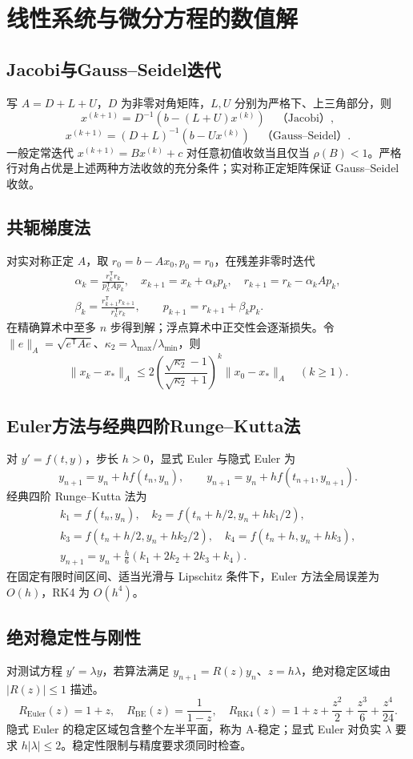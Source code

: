 \documentclass[../main.tex]{subfiles}
\begin{document}
\section{线性系统与微分方程的数值解}
\subsection{Jacobi与Gauss--Seidel迭代}
写 $A=D+L+U$，$D$ 为非零对角矩阵，$L,U$ 分别为严格下、上三角部分，则
\[
x^{(k+1)}=D^{-1}(b-(L+U)x^{(k)})\quad\text{（Jacobi）},
\]
\[
x^{(k+1)}=(D+L)^{-1}(b-Ux^{(k)})\quad\text{（Gauss--Seidel）}.
\]
一般定常迭代 $x^{(k+1)}=Bx^{(k)}+c$ 对任意初值收敛当且仅当 $\rho(B)<1$。严格行对角占优是上述两种方法收敛的充分条件；实对称正定矩阵保证 Gauss--Seidel 收敛。
\subsection{共轭梯度法}
对实对称正定 $A$，取 $r_0=b-Ax_0,p_0=r_0$，在残差非零时迭代
\begin{gather*}
\alpha_k=\frac{r_k^{\mathsf T}r_k}{p_k^{\mathsf T}Ap_k},\quad
x_{k+1}=x_k+\alpha_kp_k,\quad r_{k+1}=r_k-\alpha_kAp_k,\\
\beta_k=\frac{r_{k+1}^{\mathsf T}r_{k+1}}{r_k^{\mathsf T}r_k},\qquad
p_{k+1}=r_{k+1}+\beta_kp_k.
\end{gather*}
在精确算术中至多 $n$ 步得到解；浮点算术中正交性会逐渐损失。令 $\|e\|_A=\sqrt{e^{\mathsf T}Ae}$、$\kappa_2=\lambda_{\max}/\lambda_{\min}$，则
\[
\|x_k-x_*\|_A\le2\left(\frac{\sqrt{\kappa_2}-1}{\sqrt{\kappa_2}+1}\right)^k\|x_0-x_*\|_A\quad(k\ge1).
\]
\subsection{Euler方法与经典四阶Runge--Kutta法}
对 $y'=f(t,y)$，步长 $h>0$，显式 Euler 与隐式 Euler 为
\[
y_{n+1}=y_n+hf(t_n,y_n),\qquad
y_{n+1}=y_n+hf(t_{n+1},y_{n+1}).
\]
经典四阶 Runge--Kutta 法为
\begin{gather*}
k_1=f(t_n,y_n),\quad k_2=f(t_n+h/2,y_n+hk_1/2),\\
k_3=f(t_n+h/2,y_n+hk_2/2),\quad k_4=f(t_n+h,y_n+hk_3),\\
y_{n+1}=y_n+\frac h6(k_1+2k_2+2k_3+k_4).
\end{gather*}
在固定有限时间区间、适当光滑与 Lipschitz 条件下，Euler 方法全局误差为 $O(h)$，RK4 为 $O(h^4)$。
\subsection{绝对稳定性与刚性}
对测试方程 $y'=\lambda y$，若算法满足 $y_{n+1}=R(z)y_n$、$z=h\lambda$，绝对稳定区域由 $|R(z)|\le1$ 描述。
\[
R_{\mathrm{Euler}}(z)=1+z,\quad
R_{\mathrm{BE}}(z)=\frac1{1-z},\quad
R_{\mathrm{RK4}}(z)=1+z+\frac{z^2}2+\frac{z^3}6+\frac{z^4}{24}.
\]
隐式 Euler 的稳定区域包含整个左半平面，称为 A-稳定；显式 Euler 对负实 $\lambda$ 要求 $h|\lambda|\le2$。稳定性限制与精度要求须同时检查。
\end{document}
